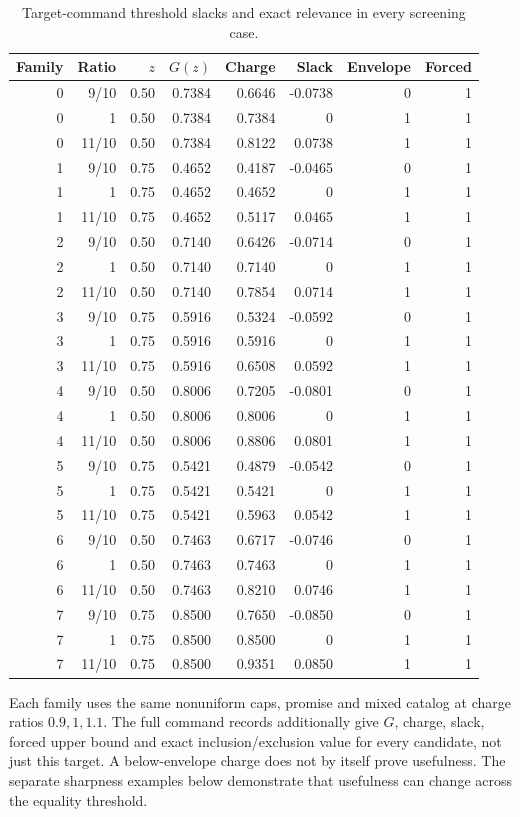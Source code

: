 \begin{table}[p]\centering\small\setlength{\tabcolsep}{3pt}
\caption{Target-command threshold slacks and exact relevance in every screening case.}\label{tab:threshold54}
\begin{tabular}{rrrrrrrr}\toprule
Family & Ratio & $z$ & $G(z)$ & Charge & Slack & Envelope & Forced\\\midrule
0 & 9/10 & 0.50 & 0.7384 & 0.6646 & -0.0738 & 0 & 1\\
0 & 1 & 0.50 & 0.7384 & 0.7384 & 0 & 1 & 1\\
0 & 11/10 & 0.50 & 0.7384 & 0.8122 & 0.0738 & 1 & 1\\
1 & 9/10 & 0.75 & 0.4652 & 0.4187 & -0.0465 & 0 & 1\\
1 & 1 & 0.75 & 0.4652 & 0.4652 & 0 & 1 & 1\\
1 & 11/10 & 0.75 & 0.4652 & 0.5117 & 0.0465 & 1 & 1\\
2 & 9/10 & 0.50 & 0.7140 & 0.6426 & -0.0714 & 0 & 1\\
2 & 1 & 0.50 & 0.7140 & 0.7140 & 0 & 1 & 1\\
2 & 11/10 & 0.50 & 0.7140 & 0.7854 & 0.0714 & 1 & 1\\
3 & 9/10 & 0.75 & 0.5916 & 0.5324 & -0.0592 & 0 & 1\\
3 & 1 & 0.75 & 0.5916 & 0.5916 & 0 & 1 & 1\\
3 & 11/10 & 0.75 & 0.5916 & 0.6508 & 0.0592 & 1 & 1\\
4 & 9/10 & 0.50 & 0.8006 & 0.7205 & -0.0801 & 0 & 1\\
4 & 1 & 0.50 & 0.8006 & 0.8006 & 0 & 1 & 1\\
4 & 11/10 & 0.50 & 0.8006 & 0.8806 & 0.0801 & 1 & 1\\
5 & 9/10 & 0.75 & 0.5421 & 0.4879 & -0.0542 & 0 & 1\\
5 & 1 & 0.75 & 0.5421 & 0.5421 & 0 & 1 & 1\\
5 & 11/10 & 0.75 & 0.5421 & 0.5963 & 0.0542 & 1 & 1\\
6 & 9/10 & 0.50 & 0.7463 & 0.6717 & -0.0746 & 0 & 1\\
6 & 1 & 0.50 & 0.7463 & 0.7463 & 0 & 1 & 1\\
6 & 11/10 & 0.50 & 0.7463 & 0.8210 & 0.0746 & 1 & 1\\
7 & 9/10 & 0.75 & 0.8500 & 0.7650 & -0.0850 & 0 & 1\\
7 & 1 & 0.75 & 0.8500 & 0.8500 & 0 & 1 & 1\\
7 & 11/10 & 0.75 & 0.8500 & 0.9351 & 0.0850 & 1 & 1\\
\bottomrule\end{tabular}
\par\smallskip\begin{minipage}{0.98\textwidth}\small Each family uses the same nonuniform caps, promise and mixed catalog at charge ratios $0.9,1,1.1$. The full command records additionally give $G$, charge, slack, forced upper bound and exact inclusion/exclusion value for every candidate, not just this target. A below-envelope charge does not by itself prove usefulness. The separate sharpness examples below demonstrate that usefulness can change across the equality threshold.\end{minipage}\end{table}\clearpage
